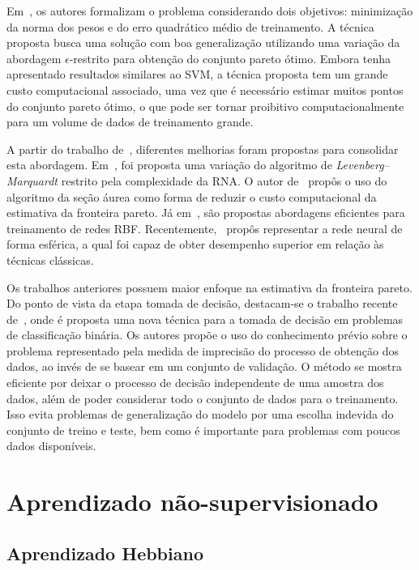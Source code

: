 \documentclass[conference]{IEEEtran}
\begin{document}
	Em~\cite{de2000improving}, os autores formalizam o problema considerando dois objetivos: minimização da norma dos pesos e do erro quadrático médio de treinamento. A técnica proposta busca uma solução com boa generalização utilizando uma variação da abordagem $\epsilon$-restrito para obtenção do conjunto pareto ótimo. Embora tenha apresentado resultados similares ao SVM, a técnica proposta tem um grande custo computacional associado, uma vez que é necessário estimar muitos pontos do conjunto pareto ótimo, o que pode ser tornar proibitivo computacionalmente para um volume de dados de treinamento grande.
	
	A partir do trabalho de~\cite{de2000improving}, diferentes melhorias foram propostas para consolidar esta abordagem. Em~\cite{costa2007improving}, foi proposta uma variação do algoritmo de \textit{Levenberg–Marquardt} restrito pela complexidade da RNA. O autor de~\cite{teixeira2007usage} propôs o uso do algoritmo da seção áurea como forma de reduzir o custo computacional da estimativa da fronteira pareto. Já em~\cite{kokshenev2010efficient, moreira2010lmi}, são propostas abordagens eficientes para treinamento de redes RBF. Recentemente,~\cite{rocha2015training} propôs representar a rede neural de forma esférica, a qual foi capaz de obter desempenho superior em relação às técnicas clássicas.
	
	Os trabalhos anteriores possuem maior enfoque na estimativa da fronteira pareto. Do ponto de vista da etapa tomada de decisão, destacam-se o trabalho recente de~\cite{de2017multi}, onde é proposta uma nova técnica para a tomada de decisão em problemas de classificação binária. Os autores propõe o uso do conhecimento prévio sobre o problema representado pela medida de imprecisão do processo de obtenção dos dados, ao invés de se basear em um conjunto de validação. O método se mostra eficiente por deixar o processo de decisão independente de uma amostra dos dados, além de poder considerar todo o conjunto de dados para o treinamento. Isso evita problemas de generalização do modelo por uma escolha indevida do conjunto de treino e teste, bem como é importante para problemas com poucos dados disponíveis.
	
	\section{Aprendizado não-supervisionado}
	
	\subsection{Aprendizado Hebbiano}
	
\end{document}

